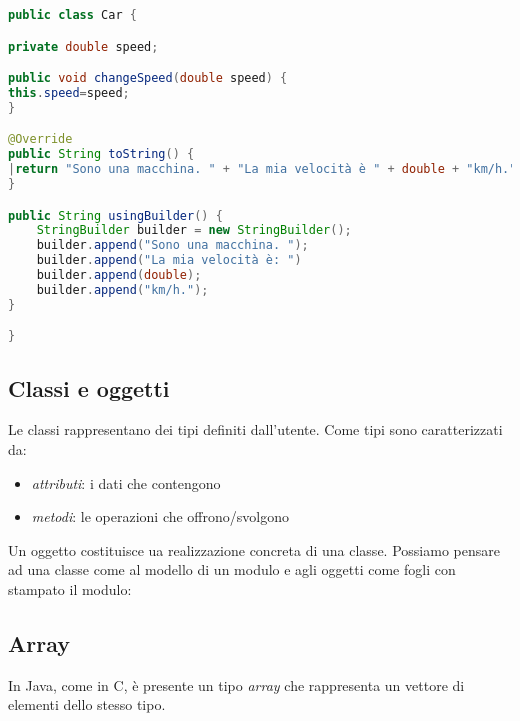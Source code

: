 \documentclass{article}
\begin{document}
\begin{lstlisting}[language=Java,escapechar=|]
public class Car {

private double speed;

public void changeSpeed(double speed) {
this.speed=speed;   
}

@Override
public String toString() {
|return "Sono una macchina. " + "La mia velocità è " + double + "km/h.";|
}

public String usingBuilder() {
	StringBuilder builder = new StringBuilder();
	builder.append("Sono una macchina. ");
    builder.append("La mia velocità è: ")
	builder.append(double);
	builder.append("km/h.");
}

}
\end{lstlisting}

\subsection{Classi e oggetti}

Le classi rappresentano dei tipi definiti dall'utente.
Come tipi sono caratterizzati da:
\begin{itemize}
	\item \emph{attributi}: i dati che contengono
	\item \emph{metodi}: le operazioni che offrono/svolgono
\end{itemize}

Un oggetto costituisce ua realizzazione concreta di una classe.
Possiamo pensare ad una classe come al modello di
un modulo e agli oggetti come fogli con stampato il modulo:


\subsection{Array}

In Java, come in C, è presente un tipo \emph{array} che rappresenta
un vettore di elementi dello stesso tipo.
\end{document}
